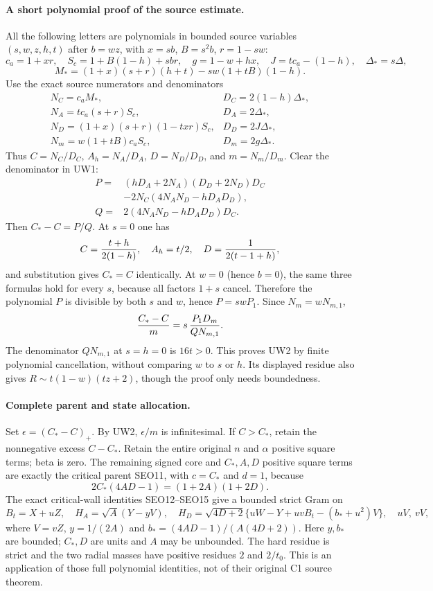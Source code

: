 \paragraph{A short polynomial proof of the source estimate.}
All the following letters are polynomials in bounded source variables
$(s,w,z,h,t)$ after $b=wz$, with $x=sb$, $B=s^2b$, $r=1-sw$:
\[
 c_a=1+xr,\quad S_c=1+B(1-h)+sbr,\quad
 g=1-w+hx,\quad J=t c_a-(1-h),\quad \Delta_*=s\Delta,
\]
\[
 M_*=(1+x)(s+r)(h+t)-sw(1+tB)(1-h).
\]
Use the exact source numerators and denominators
\[
 \begin{array}{ll}
 N_C=c_aM_*,&D_C=2(1-h)\Delta_*,\\
 N_A=t c_a(s+r)S_c,&D_A=2\Delta_*,\\
 N_D=(1+x)(s+r)(1-txr)S_c,&D_D=2J\Delta_*,\\
 N_m=w(1+tB)c_aS_c,&D_m=2g\Delta_*.
 \end{array}
\]
Thus $C=N_C/D_C$, $A_h=N_A/D_A$, $D=N_D/D_D$,
and $m=N_m/D_m$. Clear the denominator in UW1:
\[
 \begin{split}
 P={}&(hD_A+2N_A)(D_D+2N_D)D_C\\
     &-2N_C(4N_AN_D-hD_AD_D),\\
 Q={}&2(4N_AN_D-hD_AD_D)D_C.
 \end{split}                                                  \tag{UW3}
\]
Then $C_*-C=P/Q$. At $s=0$ one has
\[
 C={t+h\over2(1-h)},\quad A_h=t/2,\quad
 D={1\over2(t-1+h)},
\]
and substitution gives $C_*=C$ identically. At $w=0$ (hence
$b=0$), the same three formulas hold for every $s$, because all
factors $1+s$ cancel. Therefore the polynomial $P$ is divisible by
both $s$ and $w$, hence $P=swP_1$. Since $N_m=wN_{m,1}$,
\[
 {C_*-C\over m}=s\,{P_1D_m\over QN_{m,1}}.
\]
The denominator $QN_{m,1}$ at $s=h=0$ is $16t>0$.
This proves UW2 by finite polynomial cancellation, without comparing
$w$ to $s$ or $h$.  Its displayed residue also gives
$R\sim t(1-w)(tz+2)$, though the proof only needs boundedness.

\paragraph{Complete parent and state allocation.}
Set $\epsilon=(C_*-C)_+$. By UW2, $\epsilon/m$ is
infinitesimal. If $C>C_*$, retain the nonnegative excess $C-C_*$.
Retain the entire original $n$ and $\alpha$ positive square terms; beta is zero.
The remaining signed core and $C_*,A,D$ positive square terms are exactly the
critical parent SEO11, with $c=C_*$ and $d=1$, because
\[
                  2C_*(4AD-1)=(1+2A)(1+2D).
\]
The exact critical-wall identities SEO12--SEO15 give a bounded strict
Gram on
\[
 B_t=X+uZ,\quad H_A=\sqrt A(Y-yV),\quad
 H_D=\sqrt{4D+2}\{uW-Y+uvB_t-(b_*+u^2)V\},
 \quad uV,\ vV,
\]
where $V=vZ$, $y=1/(2A)$ and
$b_*=(4AD-1)/(A(4D+2))$. Here $y,b_*$ are bounded;
$C_*,D$ are units and $A$ may be unbounded. The hard residue is
strict and the two radial masses have positive residues $2$ and
$2/t_0$. This is an application of those full polynomial identities,
not of their original C1 source theorem.

